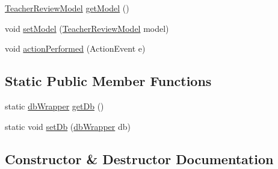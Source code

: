 \begin{DoxyCompactItemize}
\item 
\mbox{\hyperlink{classcom_1_1_b_n_u_1_1pages_1_1teacher__review_1_1_teacher_review_model}{Teacher\+Review\+Model}} \mbox{\hyperlink{classcom_1_1_b_n_u_1_1pages_1_1teacher__review_1_1_teacher_review_controller_a54916a0592a149208bb68c3d08bea744}{get\+Model}} ()
\item 
void \mbox{\hyperlink{classcom_1_1_b_n_u_1_1pages_1_1teacher__review_1_1_teacher_review_controller_a6c129fc96e1b2d5171bfea27724f5103}{set\+Model}} (\mbox{\hyperlink{classcom_1_1_b_n_u_1_1pages_1_1teacher__review_1_1_teacher_review_model}{Teacher\+Review\+Model}} model)
\item 
void \mbox{\hyperlink{classcom_1_1_b_n_u_1_1pages_1_1teacher__review_1_1_teacher_review_controller_afba887cadb38c64a8955717aab897296}{action\+Performed}} (Action\+Event e)
\end{DoxyCompactItemize}
\subsection*{Static Public Member Functions}
\begin{DoxyCompactItemize}
\item 
static \mbox{\hyperlink{interfacecom_1_1_b_n_u_1_1database_1_1db_wrapper}{db\+Wrapper}} \mbox{\hyperlink{classcom_1_1_b_n_u_1_1pages_1_1teacher__review_1_1_teacher_review_controller_aab85eb42938c532187d13c782560bff4}{get\+Db}} ()
\item 
static void \mbox{\hyperlink{classcom_1_1_b_n_u_1_1pages_1_1teacher__review_1_1_teacher_review_controller_ab9eeb91b1479ae23ba5652dbbba4dae5}{set\+Db}} (\mbox{\hyperlink{interfacecom_1_1_b_n_u_1_1database_1_1db_wrapper}{db\+Wrapper}} db)
\end{DoxyCompactItemize}


\subsection{Constructor \& Destructor Documentation}
\mbox{\label{classcom_1_1_b_n_u_1_1pages_1_1teacher__review_1_1_teacher_review_controller_a97694fc4390e4d092b746706e14cd1a3}} 
